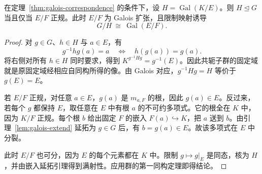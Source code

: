 \documentclass[lang=cn,a4paper,fontset=none,zihao=false,10pt,openany,twoside]{beautybook}
\numberwithin{algorithm}{chapter}
\begin{document}
\begin{theorem}[正规子群与限制映射]\label{thm:galois-normal-quotient}
在定理~\ref{thm:galois-correspondence} 的条件下，设 $H=\operatorname{Gal}(K/E)$。则 $H\trianglelefteq G$ 当且仅当 $E/F$ 正规。此时 $E/F$ 为 Galois 扩张，且限制映射诱导
\[
 G/H\ \cong\ \operatorname{Gal}(E/F).
\]
\end{theorem}
\begin{proof}
对 $g\in G$、$h\in H$ 与 $a\in E$，有
\[
 g^{-1}hg(a)=a \quad\Longleftrightarrow\quad h(g(a))=g(a).
\]
将右侧对所有 $h\in H$ 同时要求，得到 $K^{g^{-1}Hg}=g^{-1}(E)$。因此共轭子群的固定域就是原固定域经相应自同构所得的像。由 Galois 对应，$g^{-1}Hg=H$ 等价于 $g(E)=E$。

若 $E/F$ 正规，对任意 $a\in E$，$g(a)$ 是 $m_{a,F}$ 的根，因此 $g(a)\in E$。反过来，若每个 $g$ 都保持 $E$，取任意在 $E$ 中有根 $a$ 的不可约多项式。它的根全在 $K$ 中，因为 $K/F$ 正规。每个根 $b$ 给出固定 $F$ 的嵌入 $F(a)\hookrightarrow K$，把 $a$ 送到 $b$。由引理~\ref{lem:galois-extend} 延拓为 $g\in G$ 后，有 $b=g(a)\in E$。故该多项式在 $E$ 中分裂。

此时 $E/F$ 也可分，因为 $E$ 的每个元素都在 $K$ 中。限制 $g\mapsto g|_E$ 是同态，核为 $H$，并由嵌入延拓引理得到满射性。应用群的第一同构定理即得结论。
\end{proof}
\end{document}
